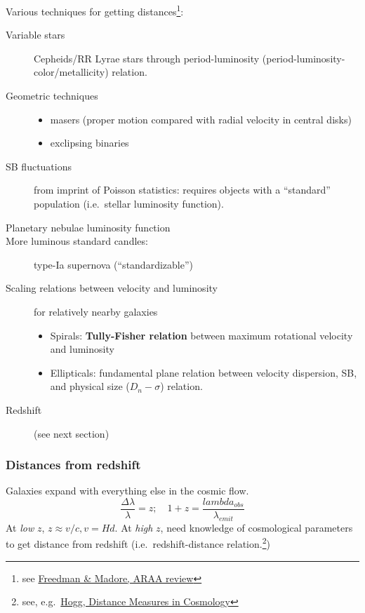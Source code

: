\documentclass{article}
\newcommand{\mynotes}[1]{\textcolor{cadmiumorange}{#1}}
\begin{document}
Various techniques for getting distances\footnote{see
\href{http://adsabs.harvard.edu/abs/2010ARA\%26A..48..673F}
{Freedman \& Madore, ARAA review}}:
\begin{description}
    \item [Variable stars] Cepheids/RR Lyrae stars through period-luminosity
        (period-luminosity-color/metallicity) relation.
    \item [Geometric techniques]
        \begin{itemize}
            \item masers (proper motion compared with radial velocity in
                central disks)
            \item exclipsing binaries
        \end{itemize}
    \item [SB fluctuations] from imprint of Poisson statistics:
        requires objects with a ``standard'' population (i.e.\ stellar
        luminosity function).
    \item [Planetary nebulae luminosity function]
    \item [More luminous standard candles:] type-Ia supernova (``standardizable'')
    \item [Scaling relations between velocity and luminosity]
        \mynotes{for relatively nearby galaxies}
        \begin{itemize}
            \item Spirals: \textbf{Tully-Fisher relation} between maximum
                rotational velocity and luminosity
            \item Ellipticals: fundamental plane relation between velocity
                dispersion, SB, and physical size
                ($D_{n}-\sigma$) relation.
        \end{itemize}
    \item [Redshift] (see next section)
\end{description}
\subsubsection{Distances from redshift}
Galaxies expand with everything else in the cosmic flow.
\[
    \frac{\Delta\lambda}{\lambda} = z;\quad
    1+z = \frac{lambda_{obs}}{\lambda_{emit}}
    \]
At \emph{low} $z$, $z \approx v/c, v=Hd$.
At \emph{high} $z$, need knowledge of cosmological
parameters to get distance from redshift (i.e.\ redshift-distance
relation.\footnote{see, e.g.\
\href{http://ned.ipac.caltech.edu/level5/Hogg/Hogg_contents.html}
{Hogg, Distance Measures in Cosmology}})
\end{document}
